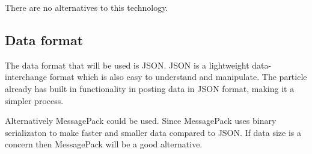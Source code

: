 \documentclass[paper=a4, fontsize=11pt]{scrartcl} %
\begin{document}
	There are no alternatives to this technology.
	\subsection{Data format}
	The data format that will be used is JSON. JSON is a lightweight data-interchange format which is also easy to understand and
	manipulate. The particle already has built in functionality in posting data in JSON format, making it a simpler process.
	
	Alternatively MessagePack could be used. Since MessagePack uses binary serializaton to make faster and smaller data compared to JSON.
	If data size is a concern then MessagePack will be a good alternative.
\end{document}
